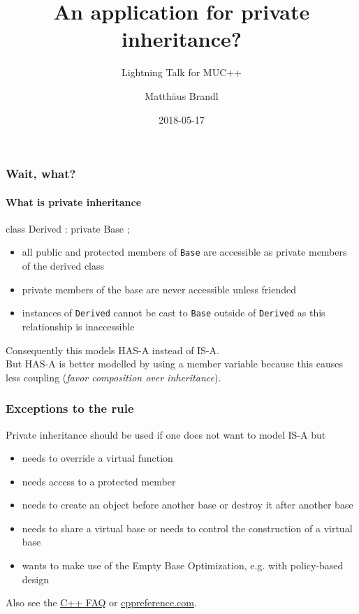\documentclass{beamer}
\title{An application for private inheritance?}
\subtitle{Lightning Talk for MUC++}
\author{Matth\"aus Brandl}
\date{2018-05-17}
\def\code#1{\texttt{#1}}
\def\link#1#2{\href{#1}{\usebeamercolor[fg]{structure} \underline{#2}}}
\begin{document}

\frame{\titlepage}


\begin{frame}[fragile]
\frametitle{Wait, what?}
\framesubtitle{What is private inheritance}

\begin{C++}
class Derived : private Base
{};
\end{C++}

\begin{itemize}
\item all public and protected members of \code{Base} are accessible as private members of the derived class
\item private members of the base are never accessible unless friended
\item instances of \code{Derived} cannot be cast to \code{Base} outside of \code{Derived} as this relationship is inaccessible
\end{itemize}

Consequently this models HAS-A instead of IS-A.\\
But HAS-A is better modelled by using a member variable because this causes less coupling (\textit{favor composition over inheritance}).
\end{frame}


\begin{frame}[fragile]
\frametitle{Exceptions to the rule}
Private inheritance should be used if one does not want to model IS-A but
\begin{itemize}
\item needs to override a virtual function
\item needs access to a protected member
\item needs to create an object before another base or destroy it after another base
\item needs to share a virtual base or needs to control the construction of a virtual base
\item wants to make use of the Empty Base Optimization, e.g. with policy-based design
\end{itemize}

Also see the \link{https://isocpp.org/wiki/faq/private-inheritance}{C++ FAQ} or \link{https://en.cppreference.com/w/cpp/language/derived_class\#Private_inheritance}{cppreference.com}.
\end{frame}
\end{document}
